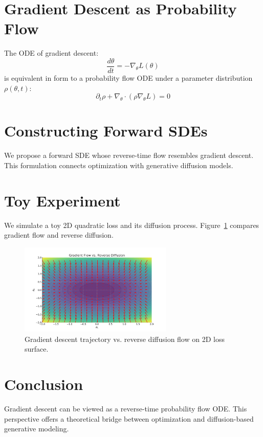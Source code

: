 \documentclass{article}
\begin{document}
\section{Gradient Descent as Probability Flow}
The ODE of gradient descent:
\[
\frac{d\theta}{dt} = -\nabla_\theta L(\theta)
\]
is equivalent in form to a probability flow ODE under a parameter distribution $\rho(\theta,t)$:
\[
\partial_t \rho + \nabla_\theta \cdot (\rho \nabla_\theta L) = 0
\]

\section{Constructing Forward SDEs}
We propose a forward SDE whose reverse-time flow resembles gradient descent. This formulation connects optimization with generative diffusion models.

\section{Toy Experiment}
We simulate a toy 2D quadratic loss and its diffusion process. Figure~\ref{fig:trajectory} compares gradient flow and reverse diffusion.

\begin{figure}[h]
\centering
\includegraphics[width=0.65\textwidth]{figures/trajectory.png}
\caption{Gradient descent trajectory vs. reverse diffusion flow on 2D loss surface.}
\label{fig:trajectory}
\end{figure}

\section{Conclusion}
Gradient descent can be viewed as a reverse-time probability flow ODE. This perspective offers a theoretical bridge between optimization and diffusion-based generative modeling.



\end{document}
